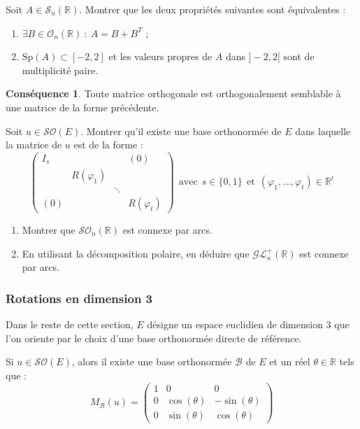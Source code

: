 \documentclass[french]{article}
\newcommand{\R}{\mathbb{R}}
\theoremstyle{plain}
\theoremstyle{definition}
\newtheorem*{conséquence}{Conséquence}
\theoremstyle{remark}
\begin{document}
\begin{exo}
	Soit $A\in\mathcal{S}_n(\R)$. Montrer que les deux propriétés suivantes sont équivalentes : 
	\begin{enumerate}[label=(\roman*)]
		\item $\exists B\in\mathcal{O}_n(\R)\ : \ A=B+B^T$ ;
		\item $\text{Sp}(A)\subset[-2,2]$ et les valeurs propres de $A$ dans $]-2,2[$ sont de multiplicité paire.
	\end{enumerate}
\end{exo}

\begin{conséquence}
	Toute matrice orthogonale est orthogonalement semblable à une matrice de la forme précédente.
\end{conséquence}

\begin{exo}
	Soit $u\in\mathcal{SO}(E)$. Montrer qu'il existe une base orthonormée de $E$ dans laquelle la matrice de $u$ est de la forme : $$\begin{pmatrix}
		I_s&&&(0)\\
		&R(\varphi_1)&&\\
		&&\ddots&\\
		(0)&&&R(\varphi_t)
	\end{pmatrix}\ \ \text{avec}\ \ s\in\{0,1\}\ \ \text{et}\ \ (\varphi_1,\ldots,\varphi_t)\in\R^t$$
\end{exo}

\begin{exo}
	\begin{enumerate}
		\item Montrer que $\mathcal{SO}_n(\R)$ est connexe par arcs. 
		\item En utilisant la décomposition polaire, en déduire que $\mathcal{GL}_n^+(\R)$ est connexe par arcs.
	\end{enumerate}
\end{exo}

\subsubsection*{Rotations en dimension 3}
Dans le reste de cette section, $E$ désigne un espace euclidien de dimension $3$ que l'on oriente par le choix d'une base orthonormée directe de référence.

\begin{prop}
	Si $u\in\mathcal{SO}(E)$, alors il existe une base orthonormée $\mathcal{B}$ de $E$ et un réel $\theta\in\R$ tels que : $$M_\mathcal{B}(u)=\begin{pmatrix}
		1&0&0\\
		0&\cos(\theta)&-\sin(\theta)\\
		0&\sin(\theta)&\cos(\theta)
	\end{pmatrix}$$
\end{prop}
\end{document}
